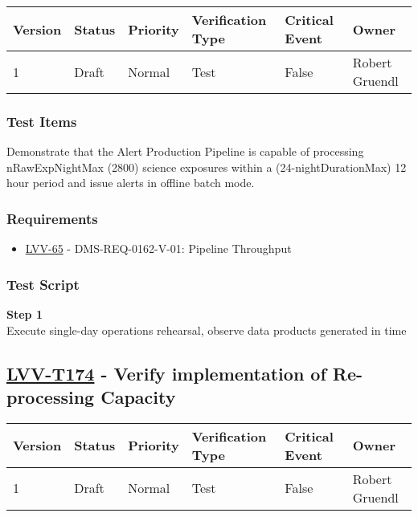 \begin{longtable}[]{@{}llllll@{}}
\toprule
Version & Status & Priority & Verification Type & Critical Event &
Owner\tabularnewline
\midrule
\endhead
1 & Draft & Normal & Test & False & Robert Gruendl\tabularnewline
\bottomrule
\end{longtable}

\subsubsection{Test Items}\label{test-items-37}

Demonstrate that the Alert Production Pipeline is capable of processing
nRawExpNightMax (2800) science exposures within a (24-nightDurationMax)
12 hour period and issue alerts in offline batch mode.~

\subsubsection{Requirements}\label{requirements-37}

\begin{itemize}
\tightlist
\item
  \href{https://jira.lsstcorp.org/browse/LVV-65}{LVV-65} -
  DMS-REQ-0162-V-01: Pipeline Throughput
\end{itemize}

\subsubsection{Test Script}\label{test-script-37}

\textbf{Step 1}\\
Execute single-day operations rehearsal, observe data products generated
in time\\[2\baselineskip]

\hypertarget{lvv-t174---verify-implementation-of-re-processing-capacity}{\subsection{\texorpdfstring{\href{https://jira.lsstcorp.org/secure/Tests.jspa\#/testCase/LVV-T174}{LVV-T174}
- Verify implementation of Re-processing
Capacity}{LVV-T174 - Verify implementation of Re-processing Capacity}}\label{lvv-t174---verify-implementation-of-re-processing-capacity}}

\begin{longtable}[]{@{}llllll@{}}
\toprule
Version & Status & Priority & Verification Type & Critical Event &
Owner\tabularnewline
\midrule
\endhead
1 & Draft & Normal & Test & False & Robert Gruendl\tabularnewline
\bottomrule
\end{longtable}

